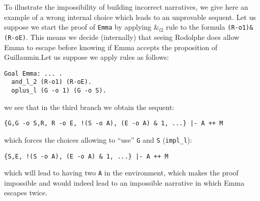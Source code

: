 \documentclass[runningheads,a4paper]{llncs}
\begin{document}
To illustrate the impossibility of building incorrect narratives, we
give here an example of a wrong internal choice which leads to an
unprovable sequent. Let us suppose we start the proof of \texttt{Emma}
by applying $\&_{l2}$ rule to the formula \lstinline!(R-o1)&(R-oE)!.
This means we decide (internally) that seeing Rodolphe does allow Emma
to escape before knowing if Emma accepts the proposition of
Guillaumin.Let us suppose we apply rules as follows:
\begin{lstlisting}
Goal Emma: ... .
  and_l_2 (R-o1) (R-oE).
  oplus_l (G -o 1) (G -o S).
\end{lstlisting}
we see that in the third branch we obtain the sequent:
\begin{lstlisting}
{G,G -o S,R, R -o E, !(S -o A), (E -o A) & 1, ...} |- A ++ M
\end{lstlisting}
which forces the choices allowing to ``use'' \texttt{G} and \texttt{S}
(\lstinline!impl_l!):
\begin{lstlisting}
{S,E, !(S -o A), (E -o A) & 1, ...} |- A ++ M
\end{lstlisting}
which will lead to having two \texttt{A} in the environment, which
makes the proof impossible and would indeed lead to an impossible
narrative in which Emma escapes twice.









\end{document}
